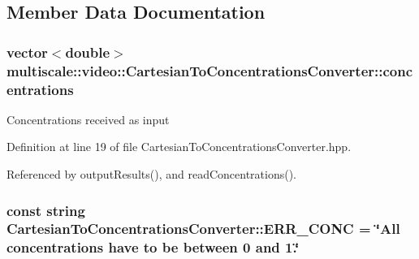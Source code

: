 \subsection{\-Member \-Data \-Documentation}
\hypertarget{classmultiscale_1_1video_1_1CartesianToConcentrationsConverter_a335f54163cbabeaa80c1da811b9f9c0c}{
\subsubsection[{concentrations}]{\setlength{\rightskip}{0pt plus 5cm}vector$<$double$>$ {\bf multiscale\-::video\-::\-Cartesian\-To\-Concentrations\-Converter\-::concentrations}}}\label{classmultiscale_1_1video_1_1CartesianToConcentrationsConverter_a335f54163cbabeaa80c1da811b9f9c0c}
\-Concentrations received as input 

\-Definition at line 19 of file \-Cartesian\-To\-Concentrations\-Converter.\-hpp.



\-Referenced by output\-Results(), and read\-Concentrations().

\hypertarget{classmultiscale_1_1video_1_1CartesianToConcentrationsConverter_aef2ea334bd0d1b4fa35cf41a2d36369b}{
\subsubsection[{\-E\-R\-R\-\_\-\-C\-O\-N\-C}]{\setlength{\rightskip}{0pt plus 5cm}const string {\bf \-Cartesian\-To\-Concentrations\-Converter\-::\-E\-R\-R\-\_\-\-C\-O\-N\-C} = \char`\"{}\-All {\bf concentrations} have to be between 0 and 1.\char`\"{}}}\label{classmultiscale_1_1video_1_1CartesianToConcentrationsConverter_aef2ea334bd0d1b4fa35cf41a2d36369b}


